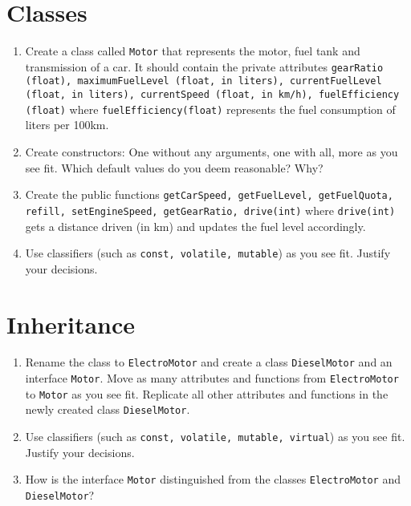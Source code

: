 \documentclass[12pt, a4paper]{article}
\begin{document}
\section*{Classes}
\begin{enumerate}
    \item Create a class called \lstinline{Motor} that represents the motor, fuel tank and transmission of a car. It should contain the private attributes \lstinline[breaklines=true]{gearRatio (float), maximumFuelLevel (float, in liters), currentFuelLevel (float, in liters), currentSpeed (float, in km/h), fuelEfficiency (float)} where \lstinline{fuelEfficiency(float)} represents the fuel consumption of liters per 100km.
    \item Create constructors: One without any arguments, one with all, more as you see fit. Which default values do you deem reasonable? Why?
    \item Create the public functions \lstinline[breaklines=true]{getCarSpeed, getFuelLevel, getFuelQuota, refill, setEngineSpeed, getGearRatio, drive(int)} where \lstinline{drive(int)} gets a distance driven (in km) and updates the fuel level accordingly.
    \item Use classifiers (such as \lstinline[breaklines=true]{const, volatile, mutable}) as you see fit. Justify your decisions.
\end{enumerate}
\section*{Inheritance}
\begin{enumerate}
    \item Rename the class to \lstinline{ElectroMotor} and create a class \lstinline{DieselMotor} and an interface \lstinline{Motor}. Move as many attributes and functions from \lstinline{ElectroMotor} to \lstinline{Motor} as you see fit. Replicate all other attributes and functions in the newly created class \lstinline{DieselMotor}.
    \item Use classifiers (such as \lstinline{const, volatile, mutable, virtual}) as you see fit. Justify your decisions.
    \item How is the interface \lstinline{Motor} distinguished from the classes \lstinline{ElectroMotor} and \lstinline{DieselMotor}?
\end{enumerate}
\end{document}
